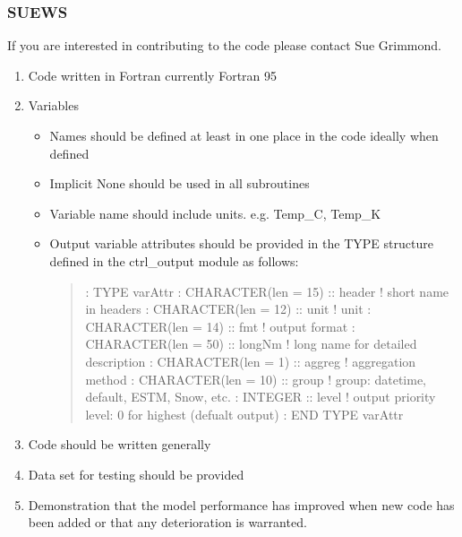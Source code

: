 \documentclass[letterpaper,10pt,english]{sphinxmanual}
\begin{document}
\subsubsection{SUEWS}
\label{\detokenize{DevelopmentGuidelines:suews}}
If you are interested in contributing to the code please contact Sue
Grimmond.
\begin{enumerate}
\item {} 
Code written in Fortran \textendash{} currently Fortran 95

\item {} 
Variables
\begin{itemize}
\item {} 
Names should be defined at least in one place in the code \textendash{}
ideally when defined

\item {} 
Implicit None should be used in all subroutines

\item {} 
Variable name should include units. e.g. Temp\_C, Temp\_K

\item {} 
Output variable attributes should be provided in the TYPE
structure defined in the ctrl\_output module as follows:
\begin{quote}

%
\begin{sphinxVerbatim}[commandchars=\\\{\}]
: TYPE varAttr
: CHARACTER(len = 15) :: header ! short name in headers
: CHARACTER(len = 12) :: unit   ! unit
: CHARACTER(len = 14) :: fmt    ! output format
: CHARACTER(len = 50) :: longNm ! long name for detailed description
: CHARACTER(len = 1)  :: aggreg ! aggregation method
: CHARACTER(len = 10) :: group  ! group: datetime, default, ESTM, Snow, etc.
: INTEGER             :: level  ! output priority level: 0 for highest (defualt output)
: END TYPE varAttr
\end{sphinxVerbatim}
\end{quote}

\end{itemize}

\item {} 
Code should be written generally

\item {} 
Data set for testing should be provided

\item {} 
Demonstration that the model performance has improved when new code
has been added or that any deterioration is warranted.


\end{enumerate}
\end{document}

